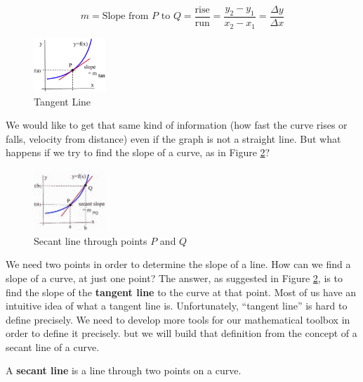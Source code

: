 $$m = \mbox{Slope from } P \mbox{ to } Q = \frac{\mbox{rise}}{\mbox{run}} = \frac{y_2-y_1}{x_2-x_1} = \frac{\Delta y}{\Delta x}$$


\begin{figure}
  \vspace{-10pt}
  \centering
    \includegraphics[width=0.24\textwidth]{img/chap2/image002.png}
\caption{Tangent Line}
\label{fig:2-slopeCurve}
\vspace{-10pt}
\end{figure}
We would like to get that same kind of information (how fast the curve rises or falls, velocity from distance) even if the graph is not a straight line. But what happens if we try to find the slope of a curve, as in Figure \ref{fig:2-slopeCurve}?

\begin{figure}
  \vspace{-10pt}
  \centering
    \includegraphics[width=0.24\textwidth]{img/chap2/image111.png}
\caption{Secant line through points $P$ and $Q$}
\label{fig:2-slopeCurve}
\vspace{-10pt}
\end{figure}

We need two points in order to determine the slope of a line. How can we find a slope of a curve, at just one point? The answer, as suggested in Figure \ref{fig:2-slopeCurve}, is to find the slope of the {\bf tangent line} to the curve at that point. Most of us have an intuitive idea of what a tangent line is. Unfortunately, ``tangent line'' is hard to define precisely. We need to develop more tools for our mathematical toolbox in order to define it precisely. but we will build that definition from the concept of a secant line of a curve.
\begin{definition}
A {\bf secant line} is a line through two points on a curve. 
\end{definition}



